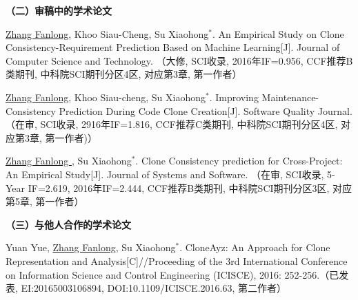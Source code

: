 \newpage
\noindent\textbf{（二）审稿中的学术论文}
\begin{publist}

\item
\underline{Zhang Fanlong},  Khoo Siau-Cheng, Su Xiaohong{$^*$}. An Empirical Study on Clone Consistency-Requirement Prediction Based on Machine Learning[J]. Journal of Computer Science and Technology.
（大修, SCI收录, 2016年IF=0.956, CCF推荐B类期刊, 中科院SCI期刊分区4区, 对应第3章, 第一作者）

\item
\underline{Zhang Fanlong}, Khoo Siau-cheng, Su Xiaohong{$^*$}. Improving Maintenance-Consistency Prediction During Code Clone Creation[J]. Software Quality Journal. 
（在审, SCI收录, 2916年IF=1.816, CCF推荐C类期刊, 中科院SCI期刊分区4区, 对应第3章, 第一作者)）

\item
\underline{Zhang Fanlong }, Su Xiaohong{$^*$}. Clone Consistency prediction for Cross-Project: An Empirical Study[J]. Journal of Systems and Software.
（在审, SCI收录, 5-Year IF=2.619, 2016年IF=2.444, CCF推荐B类期刊, 中科院SCI期刊分区3区, 对应第5章, 第一作者）



\end{publist}

\noindent\textbf{（三）与他人合作的学术论文}
\begin{publist}
\item
Yuan Yue, \underline{Zhang Fanlong},  Su Xiaohong{$^*$}. CloneAyz: An Approach for Clone Representation and Analysis[C]//Proceeding of the 3rd International Conference on Information Science and Control Engineering (ICISCE), 2016: 252-256.（已发表, EI:20165003106894, DOI:10.1109/ICISCE.2016.63, 第二作者）
\end{publist}




